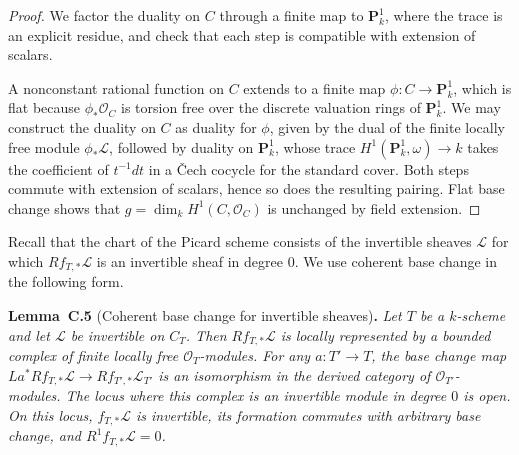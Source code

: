 \documentclass[11pt]{article}
\newenvironment{bpstatement}[2]{\par\addvspace{0.6\baselineskip}\noindent\textbf{#1}#2\textbf{.}\enspace\ignorespaces}
  {\par\addvspace{0.4\baselineskip}}
\newenvironment{bpstatementit}[2]{\begin{bpstatement}{#1}{#2}\itshape\ignorespaces}{\end{bpstatement}}
\begin{document}
\begin{proof}[{Proof}]\label{bp15}%
We factor the duality on \(C\) through a finite map to \(\mathbf P^1_k\), where the trace is an explicit residue, and check that each step is compatible with extension of scalars.

A nonconstant rational function on \(C\) extends to a finite map \(\phi:C\to\mathbf P^1_k\), which is flat because \(\phi_*\mathcal O_C\) is torsion free over the discrete valuation rings of \(\mathbf P^1_k\). We may construct the duality on \(C\) as duality for \(\phi\), given by the dual of the finite locally free module \(\phi_*\mathcal L\), followed by duality on \(\mathbf P^1_k\), whose trace \(H^1(\mathbf P^1_k,\omega)\to k\) takes the coefficient of \(t^{-1}dt\) in a Čech cocycle for the standard cover. Both steps commute with extension of scalars, hence so does the resulting pairing. Flat base change shows that \(g=\dim_kH^1(C,\mathcal O_C)\) is unchanged by field extension.
\end{proof}

\label{bp16}%
Recall that the chart of the Picard scheme consists of the invertible sheaves \(\mathcal L\) for which \(Rf_{T,*}\mathcal L\) is an invertible sheaf in degree \(0\). We use coherent base change in the following form.

\label{bp17}%
\begin{bpstatementit}{Lemma~C.5}{ (Coherent base change for invertible sheaves)}
Let \(T\) be a \(k\)-scheme and let \(\mathcal L\) be invertible on \(C_T\). Then \(Rf_{T,*}\mathcal L\) is locally represented by a bounded complex of finite locally free \(\mathcal O_T\)-modules. For any \(a:T'\to T\), the base change map \(La^*Rf_{T,*}\mathcal L\to Rf_{T',*}\mathcal L_{T'}\) is an isomorphism in the derived category of \(\mathcal O_{T'}\)-modules. The locus where this complex is an invertible module in degree \(0\) is open. On this locus, \(f_{T,*}\mathcal L\) is invertible, its formation commutes with arbitrary base change, and \(R^1f_{T,*}\mathcal L=0\).
\end{bpstatementit}
\end{document}
